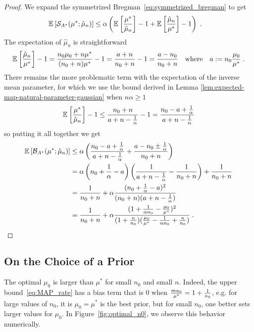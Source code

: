 \documentclass[twoside]{article}
\newcommand*{\expect}[2][]{\ensuremath{\mathbb{E}_{#1} \left[ #2 \right] }} %
\newcommand{\logpart}{A}
\newcommand{\conj}{{\logpart^*}}
\newcommand{\bregmanconj}{\cB_{\logpart^*}}
\newcommand{\m}{\mu}
\newcommand{\MAPm}{\hat \m_n}
\begin{document}
\begin{proof}
We expand the symmetrized Bregman~\eqref{eq:symmetrized_bregman} to get
\begin{align}
	\expect{\cS_\conj(\mu^*; \MAPm)} 
	&\leq \alpha \paren{\expect{\frac{\mu^*}{\MAPm}} -1  + \expect{\frac{\MAPm}{\mu^*}} - 1} \; .
\end{align}
The expectation of $\MAPm$ is straightforward
\begin{align}
	 \expect{\frac{\MAPm}{\mu^*}} - 1 
	 = \frac{n_0 \mu_0 + n \mu^*}{(n_0+n)\mu^*} - 1 
	 = \frac{a+n}{n_0+n} - 1 = \frac{a - n_0}{n_0+n}
	 \quadtext{where}
	 a:=n_0\frac{\mu_0}{\mu^*} \; .
\end{align}
There remains the more problematic term with the expectation of the inverse mean parameter, 
for which we use the bound derived in Lemma \ref{lem:expected-map-natural-parameter-gaussian}  when $n\alpha \geq 1$
\begin{align}
	\expect{\frac{\mu^*}{\MAPm}} - 1 
	\leq \frac{n_0 + n}{a +n - \inv{\alpha}} -1
	= \frac{n_0 - a + \inv{\alpha}}{a +n - \inv{\alpha}}
\end{align}
so putting it all together we get 
\begin{align}
	\expect{\bregmanconj(\mu^*; \MAPm)} 
	&\leq 
	\alpha \paren{\frac{n_0 - a + \inv{\alpha}}{a +n - \inv{\alpha}} 
	 + \frac{a - n_0 \pm \inv{\alpha}}{n_0+n}} \\
	 &=
	 \alpha \paren{n_0 + \inv{\alpha} -a}  
	 \left( \inv{a+n-\inv{\alpha}} - \inv{n_0+n} \right)
	 + \inv{n_0 + n} \\
	 &= \inv{n_0 + n} + \alpha \frac{(n_0 + \inv{\alpha} - a)^2}{(n_0 + n)(a+ n - \inv{\alpha} )} \\
	&= \inv{n_0 + n} + \alpha \frac{(1 + \inv{\alpha n_0} - \frac{\mu_0}{\mu^*})^2}{ (1 + \frac{n}{n_0} ) (\frac{\mu_0}{\mu^*} - \inv{\alpha n_0} +\frac{n}{n_0})} \; .
\end{align}
\end{proof}



\subsection{On the Choice of a Prior}
\label{app:prior-choice}
The optimal $\mu_0$ is larger than $\mu^*$ for small $n_0$ and small $n$.
Indeed, the upper bound~\eqref{eq:MAP_rate} has a bias term that is $0$ when $\frac{mu_0}{\mu^*} = 1 + \frac{1}{n_0}$, e.g. for large values of $n_0$, it is $\mu_0=\mu^*$ is the best prior, but for small $n_0$, one better sets larger values for $\mu_0$. In Figure~\ref{fig:optimal_n0}, we observe this behavior numerically.
\end{document}
